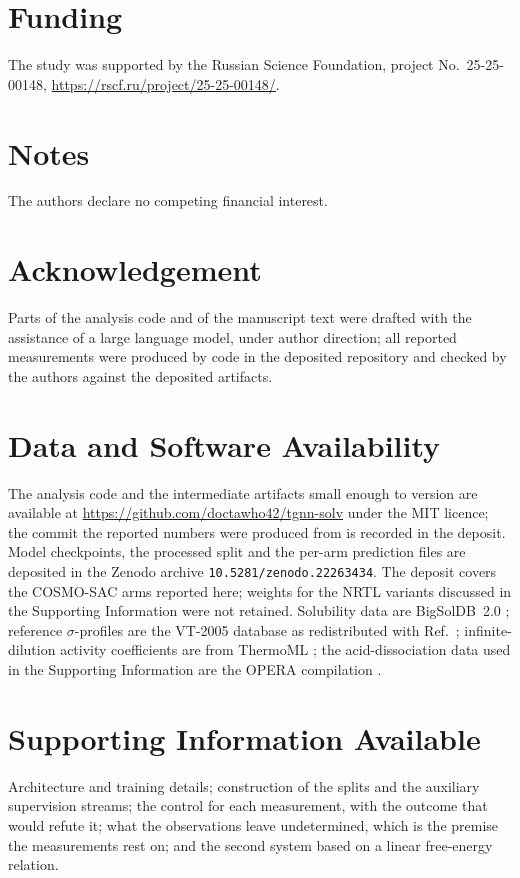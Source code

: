 \documentclass[journal=jcisd8,manuscript=article,layout=twocolumn]{achemso}
\begin{document}
\section*{Funding}
\noindent The study was supported by the Russian Science Foundation, project No.~25-25-00148,
\url{https://rscf.ru/project/25-25-00148/}.

\section*{Notes}
\noindent The authors declare no competing financial interest.

\section*{Acknowledgement}
\noindent Parts of the analysis code and of the manuscript text were drafted with the assistance of
a large language model, under author direction; all reported measurements were produced by code in
the deposited repository and checked by the authors against the deposited artifacts.

\section*{Data and Software Availability}
The analysis code and the intermediate artifacts small enough to version are available at
\url{https://github.com/doctawho42/tgnn-solv} under the MIT licence; the commit the reported
numbers were produced from is recorded in the deposit. Model checkpoints, the processed split and
the per-arm prediction files are deposited in the Zenodo archive
\texttt{10.5281/zenodo.22263434}. The deposit covers the COSMO-SAC arms reported here; weights for
the NRTL variants discussed in the Supporting Information were not retained. Solubility data are
BigSolDB~2.0 \cite{krasnov2025bigsoldb}; reference $\sigma$-profiles are the VT-2005 database
\cite{mullins2006} as redistributed with Ref.~\cite{bell2020cosmosac}; infinite-dilution activity
coefficients are from ThermoML \cite{frenkel2011thermoml}; the acid-dissociation data used in the
Supporting Information are the OPERA compilation \cite{mansouri2019opera}.

\section*{Supporting Information Available}
Architecture and training details; construction of the splits and the auxiliary supervision
streams; the control for each measurement, with the outcome that would refute it; what the observations leave
undetermined, which is the premise the measurements rest on; and the second system based on a linear
free-energy relation.


\end{document}
